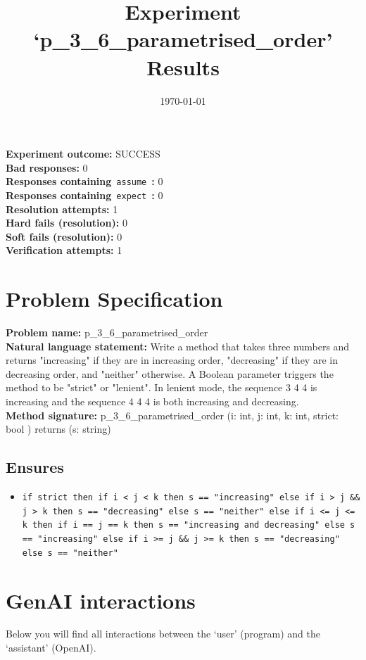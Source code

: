 \documentclass{article}
\begin{document}
\title{Experiment `p\_3\_6\_parametrised\_order' Results}
\author{\today}
\date{}
\maketitle
\textbf{Experiment outcome: }SUCCESS
\\\textbf{Bad responses: }0
\\\textbf{Responses containing}~\texttt{assume}~\textbf{: }0
\\\textbf{Responses containing}~\texttt{expect}~\textbf{: }0
\\\textbf{Resolution attempts: }1
\\\textbf{Hard fails (resolution): }0
\\\textbf{Soft fails (resolution): }0
\\\textbf{Verification attempts: }1
\section*{Problem Specification}
\textbf{Problem name: }p\_3\_6\_parametrised\_order
\\\textbf{Natural language statement: }Write a method that takes three numbers and returns "increasing" if they are in increasing order, "decreasing" if they are in decreasing order, and "neither" otherwise. A Boolean parameter triggers the method to be "strict" or "lenient". In lenient mode, the sequence 3 4 4 is increasing and the sequence 4 4 4 is both increasing and decreasing.
\\\textbf{Method signature: }p\_3\_6\_parametrised\_order (i: int, j: int, k: int, strict: bool ) returns (s: string)
\subsection*{Ensures}
\begin{itemize}
\item \texttt{if strict then if i < j < k then s == "increasing" else if i > j \&\& j > k then s == "decreasing" else s == "neither" else if i <= j <= k then if i == j == k then s == "increasing and decreasing" else s == "increasing" else if i >= j \&\& j >= k then s == "decreasing" else s == "neither"}
\end{itemize}
\clearpage
\section*{GenAI interactions}
Below you will find all interactions between the `user' (program) and the `assistant' (OpenAI).
\end{document}
